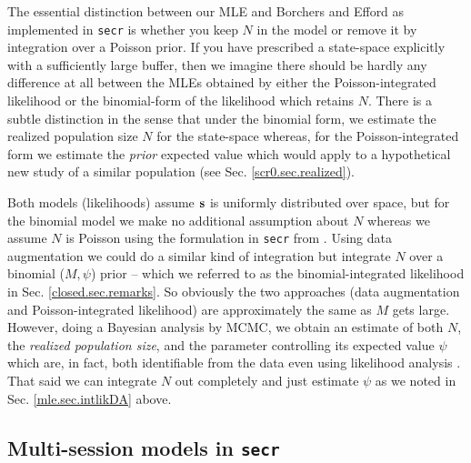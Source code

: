 The essential distinction between our MLE and Borchers and Efford as
implemented in \mbox{\tt secr} is whether you keep $N$ in the model or
remove it by integration over a Poisson prior. If you have prescribed
a state-space explicitly with a sufficiently large buffer, then we
imagine there should be hardly any difference at all between the MLEs
obtained by either the Poisson-integrated likelihood or the
binomial-form of the likelihood which retains $N$.  There is a subtle
distinction in the sense that under the binomial form, we estimate the
realized population size $N$ for the state-space whereas, for the
Poisson-integrated form we estimate the {\it prior} expected value
which would apply to a hypothetical new study of a similar population
(see Sec. \ref{scr0.sec.realized}).


Both models (likelihoods) assume ${\bf s}$ is uniformly distributed
over space, but for the binomial model we make no additional
assumption about $N$ whereas we assume $N$ is Poisson using the
formulation in \mbox{\tt secr} from \citep{borchers_efford:2008}.
Using data augmentation we could do a similar kind of integration but
integrate $N$ over a binomial ($M,\psi$) prior -- which we referred to
as the binomial-integrated likelihood in
Sec. \ref{closed.sec.remarks}. So obviously the two approaches (data
augmentation and Poisson-integrated likelihood) are approximately the
same as $M$ gets large. However, doing a Bayesian analysis by MCMC, we
obtain an estimate of both $N$, the {\it realized population size},
and the parameter controlling its expected value $\psi$ which are, in
fact, both identifiable from the data even using likelihood analysis
\citep{royle_etal:2007}.  That said we can integrate $N$ out
completely and just estimate $\psi$ as we noted in Sec.
\ref{mle.sec.intlikDA} above.











\subsection{Multi-session models in \mbox{\tt secr}}
\label{mle.sec.multisession}

